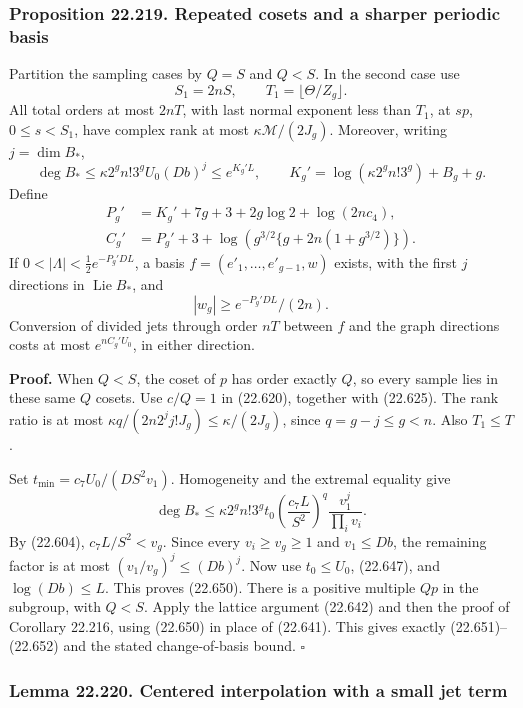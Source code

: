 \documentclass[
  11pt,
  a4paper,
]{article}
\begin{document}
\subsubsection{Proposition 22.219. Repeated cosets and a sharper
periodic
basis}\label{proposition-22.219.-repeated-cosets-and-a-sharper-periodic-basis}

Partition the sampling cases by \(Q=S\) and \(Q<S\). In the second case
use \[
 S_1=2nS,\qquad T_1=\lfloor\Theta/Z_g\rfloor.
 \tag{22.649}
\] All total orders at most \(2nT\), with last normal exponent less than
\(T_1\), at \(sp\), \(0\le s<S_1\), have complex rank at most
\(\kappa\mathcal M/(2J_g)\). Moreover, writing \(j=\dim B_*\), \[
 \deg B_*\le\kappa2^g n!3^g U_0(Db)^j
                 \le e^{K_g'L},\qquad
 K_g'=\log(\kappa2^g n!3^g)+B_g+g.
 \tag{22.650}
\] Define \[
 \begin{split}
 P_g'&=K_g'+7g+3+2g\log2+\log(2nc_4),\\
 C_g'&=P_g'+3+
  \log\left(g^{3/2}\{g+2n(1+g^{3/2})\}\right).
 \end{split}
 \tag{22.651}
\] If \(0<|\Lambda|<\tfrac12e^{-P_g'DL}\), a basis
\(f=(e'_1,\ldots,e'_{g-1},w)\) exists, with the first \(j\) directions
in \(\operatorname{Lie}B_*\), and \[
 |w_g|\ge e^{-P_g'DL}/(2n).
 \tag{22.652}
\] Conversion of divided jets through order \(nT\) between \(f\) and the
graph directions costs at most \(e^{nC_g'U_0}\), in either direction.

\textbf{Proof.} When \(Q<S\), the coset of \(p\) has order exactly
\(Q\), so every sample lies in these same \(Q\) cosets. Use \(c/Q=1\) in
(22.620), together with (22.625). The rank ratio is at most
\(\kappa q/(2n2^j j!J_g)\le\kappa/(2J_g)\), since \(q=g-j\le g<n\). Also
\(T_1\le T\).

Set \(t_{\min}=c_7U_0/(DS^2v_1)\). Homogeneity and the extremal equality
give \[
 \deg B_*\le
 \kappa2^g n!3^g t_0
       \left(\frac{c_7L}{S^2}\right)^q
       \frac{v_1^j}{\prod_i v_i}.
\] By (22.604), \(c_7L/S^2<v_g\). Since every \(v_i\ge v_g\ge1\) and
\(v_1\le Db\), the remaining factor is at most \((v_1/v_g)^j\le(Db)^j\).
Now use \(t_0\le U_0\), (22.647), and \(\log(Db)\le L\). This proves
(22.650). There is a positive multiple \(Qp\) in the subgroup, with
\(Q<S\). Apply the lattice argument (22.642) and then the proof of
Corollary 22.216, using (22.650) in place of (22.641). This gives
exactly (22.651)--(22.652) and the stated change-of-basis bound.
\(\square\)

\subsubsection{Lemma 22.220. Centered interpolation with a small jet
term}\label{lemma-22.220.-centered-interpolation-with-a-small-jet-term}
\end{document}
